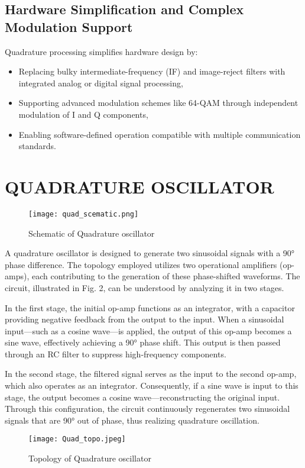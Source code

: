 \documentclass[conference]{IEEEtran}
\begin{document}
\subsection{Hardware Simplification and Complex Modulation Support}

Quadrature processing simplifies hardware design by:

\begin{itemize}
    \item Replacing bulky intermediate-frequency (IF) and image-reject filters with integrated analog or digital signal processing,
    \item Supporting advanced modulation schemes like 64-QAM through independent modulation of I and Q components,
    \item Enabling software-defined operation compatible with multiple communication standards.
\end{itemize}

\section{QUADRATURE OSCILLATOR}

\begin{figure}[H]
\centering
\texttt{[image: quad\_scematic.png]}
\caption{Schematic of Quadrature oscillator}
\end{figure}

A quadrature oscillator is designed to generate two sinusoidal signals with a 90° phase difference. The topology employed utilizes two operational amplifiers (op-amps), each contributing to the generation of these phase-shifted waveforms. The circuit, illustrated in Fig. 2, can be understood by analyzing it in two stages.

In the first stage, the initial op-amp functions as an integrator, with a capacitor providing negative feedback from the output to the input. When a sinusoidal input—such as a cosine wave—is applied, the output of this op-amp becomes a sine wave, effectively achieving a 90° phase shift. This output is then passed through an RC filter to suppress high-frequency components.

In the second stage, the filtered signal serves as the input to the second op-amp, which also operates as an integrator. Consequently, if a sine wave is input to this stage, the output becomes a cosine wave—reconstructing the original input. Through this configuration, the circuit continuously regenerates two sinusoidal signals that are 90° out of phase, thus realizing quadrature oscillation.
\begin{figure}[h]
\centering
\texttt{[image: Quad\_topo.jpeg]}
\caption{Topology of Quadrature oscillator}
\end{figure}
\end{document}
